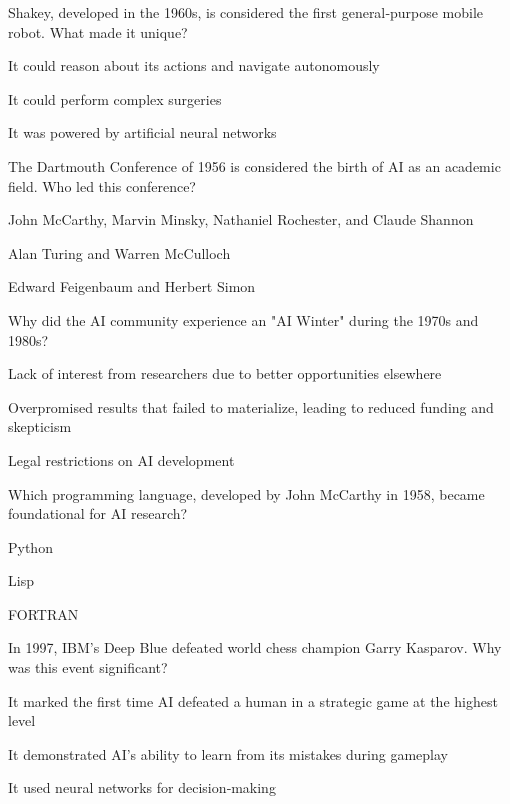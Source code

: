 \begin{enhancedmcq}{Shakey, developed in the 1960s, is considered the first general‑purpose mobile robot. What made it unique?}
\item It could reason about its actions and navigate autonomously
\item It could perform complex surgeries
\item It was powered by artificial neural networks

\end{enhancedmcq}
\begin{enhancedmcq}{The Dartmouth Conference of 1956 is considered the birth of AI as an academic field. Who led this conference?}
\item John McCarthy, Marvin Minsky, Nathaniel Rochester, and Claude Shannon
\item Alan Turing and Warren McCulloch
\item Edward Feigenbaum and Herbert Simon

\end{enhancedmcq}
\begin{enhancedmcq}{Why did the AI community experience an "AI Winter" during the 1970s and 1980s?}
\item Lack of interest from researchers due to better opportunities elsewhere
\item Overpromised results that failed to materialize, leading to reduced funding and skepticism
\item Legal restrictions on AI development

\end{enhancedmcq}
\begin{enhancedmcq}{Which programming language, developed by John McCarthy in 1958, became foundational for AI research?}
\item Python
\item Lisp
\item FORTRAN

\end{enhancedmcq}
\begin{enhancedmcq}{In 1997, IBM's Deep Blue defeated world chess champion Garry Kasparov. Why was this event significant?}
\item It marked the first time AI defeated a human in a strategic game at the highest level
\item It demonstrated AI's ability to learn from its mistakes during gameplay
\item It used neural networks for decision‑making

\end{enhancedmcq}
